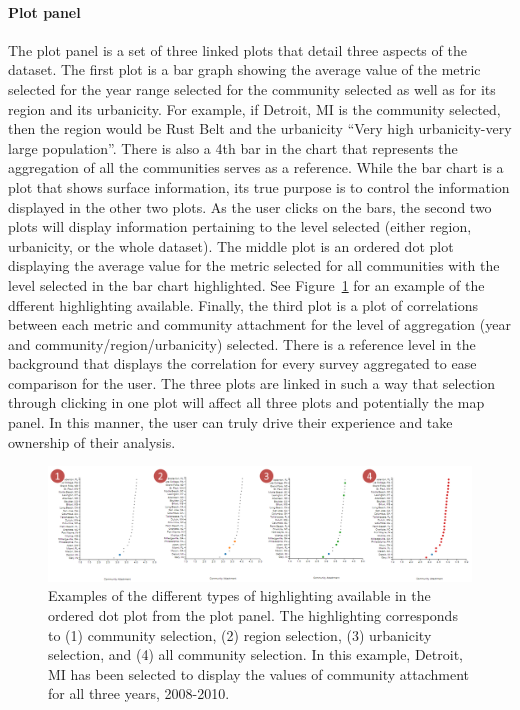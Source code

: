 \documentclass[11pt]{article}\usepackage{knitr}
\begin{document}
\paragraph{Plot panel} The plot panel is a set of three linked plots that detail three aspects of the dataset. The first plot is a bar graph showing the average value of the metric selected for the year range selected for the community selected as well as for its region and its urbanicity. For example, if Detroit, MI is the community selected, then the region would be Rust Belt and the urbanicity ``Very high urbanicity-very large population''. There is also a 4th bar in the chart that represents the aggregation of all the communities serves as a reference. While the bar chart is a plot that shows surface information, its true purpose is to control the information displayed in the other two plots. As the user clicks on the bars, the second two plots will display information pertaining to the level selected (either region, urbanicity, or the whole dataset). The middle plot is an ordered dot plot displaying the average value for the metric selected for all communities with the level selected in the bar chart highlighted. See Figure~\ref{fig:dots} for an example of the dfferent highlighting available. Finally, the third plot is a plot of correlations between each metric and community attachment for the level of aggregation (year and community/region/urbanicity) selected. There is a reference level in the background that displays the correlation for every survey aggregated to ease comparison for the user. The three plots are linked in such a way that selection through clicking in one plot will affect all three plots and potentially the map panel. In this manner, the user can truly drive their experience and take ownership of their analysis.

\begin{figure}[H]
\centering
\includegraphics[width=\textwidth]{images/dots.png}
\caption{\label{fig:dots} Examples of the different types of highlighting available in the ordered dot plot from the plot panel. The highlighting corresponds to (1) community selection, (2) region selection, (3) urbanicity selection, and (4) all community selection. In this example, Detroit, MI has been selected to display the values of community attachment for all three years, 2008-2010.}
\end{figure}
\end{document}
